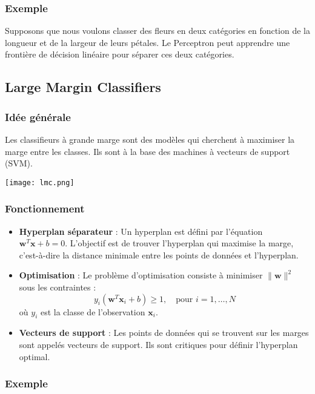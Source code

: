 \documentclass[10pt,a4paper]{article}
\begin{document}
\subsubsection*{Exemple}

Supposons que nous voulons classer des fleurs en deux catégories en fonction de la longueur et de la largeur de leurs pétales. Le Perceptron peut apprendre une frontière de décision linéaire pour séparer ces deux catégories.

\subsection*{Large Margin Classifiers}

\subsubsection*{Idée générale}

Les classifieurs à grande marge sont des modèles qui cherchent à maximiser la marge entre les classes. Ils sont à la base des machines à vecteurs de support (SVM).

\texttt{[image: lmc.png]}

\subsubsection*{Fonctionnement}

\begin{itemize}
    \item \textbf{Hyperplan séparateur} :
    Un hyperplan est défini par l'équation \( \mathbf{w}^T \mathbf{x} + b = 0 \). L'objectif est de trouver l'hyperplan qui maximise la marge, c'est-à-dire la distance minimale entre les points de données et l'hyperplan.

    \item \textbf{Optimisation} :
    Le problème d'optimisation consiste à minimiser \( \|\mathbf{w}\|^2 \) sous les contraintes :
    \[
    y_i (\mathbf{w}^T \mathbf{x}_i + b) \geq 1, \quad \text{pour } i = 1, \ldots, N
    \]
    où \( y_i \) est la classe de l'observation \( \mathbf{x}_i \).

    \item \textbf{Vecteurs de support} :
    Les points de données qui se trouvent sur les marges sont appelés vecteurs de support. Ils sont critiques pour définir l'hyperplan optimal.
\end{itemize}

\subsubsection*{Exemple}
\end{document}
